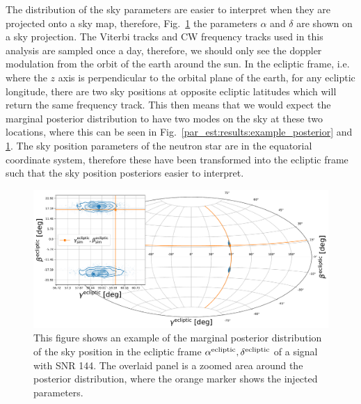 The distribution of the sky parameters are easier to interpret when they are projected onto a sky map, therefore, Fig.~\ref{par_est:results:example_skypos} the parameters $\alpha$ and $\delta$ are shown on a sky projection.
The Viterbi tracks and \gls{CW} frequency tracks used in this analysis are sampled once a day, therefore, we should only see the doppler modulation from the orbit of the earth around the sun.
In the ecliptic frame, i.e. where the $z$ axis is perpendicular to the orbital plane of the earth, for any ecliptic longitude, there are two sky positions at opposite ecliptic latitudes which will return the same frequency track. 
This then means that we would expect the marginal posterior distribution to have two modes on the sky at these two locations, where this can be seen in Fig.~\ref{par_est:results:example_posterior} and \ref{par_est:results:example_skypos}.
The sky position parameters of the neutron star are in the equatorial coordinate system, therefore these have been transformed into the ecliptic frame such that the sky position posteriors easier to interpret.
%
\begin{figure}[ht]
    \centering
    \includegraphics[width=\linewidth]{C5_parameter/skypos_ecliptic.pdf}
    \caption[Example of posterior of sky position in ecliptic frame]{This figure shows an example of the marginal posterior distribution of the sky position in the ecliptic frame $\alpha^{\rm{ecliptic}},\delta^{\rm{ecliptic}}$ of a signal with \gls{SNR} 144. The overlaid panel is a zoomed area around the posterior distribution, where the orange marker shows the injected parameters.}
    \label{par_est:results:example_skypos}
    
\end{figure}
%

%
%
